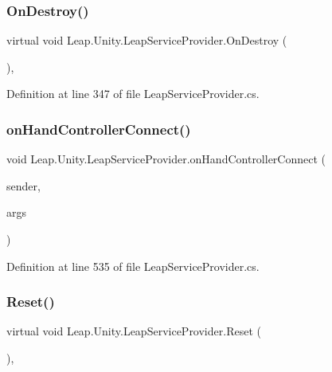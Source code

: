 \subsubsection{\texorpdfstring{OnDestroy()}{OnDestroy()}}
{\footnotesize\ttfamily virtual void Leap.\+Unity.\+Leap\+Service\+Provider.\+On\+Destroy (\begin{DoxyParamCaption}{ }\end{DoxyParamCaption})\hspace{0.3cm}{\ttfamily [protected]}, {\ttfamily [virtual]}}



Definition at line 347 of file Leap\+Service\+Provider.\+cs.

\mbox{\label{class_leap_1_1_unity_1_1_leap_service_provider_aa5658f3913410c8e03b5cc954f8754e6}} 
\subsubsection{\texorpdfstring{onHandControllerConnect()}{onHandControllerConnect()}}
{\footnotesize\ttfamily void Leap.\+Unity.\+Leap\+Service\+Provider.\+on\+Hand\+Controller\+Connect (\begin{DoxyParamCaption}\item[{object}]{sender,  }\item[{\mbox{\hyperlink{class_leap_1_1_leap_event_args}{Leap\+Event\+Args}}}]{args }\end{DoxyParamCaption})\hspace{0.3cm}{\ttfamily [protected]}}



Definition at line 535 of file Leap\+Service\+Provider.\+cs.

\mbox{\label{class_leap_1_1_unity_1_1_leap_service_provider_af249b412176e1018f24d4628cb476316}} 
\subsubsection{\texorpdfstring{Reset()}{Reset()}}
{\footnotesize\ttfamily virtual void Leap.\+Unity.\+Leap\+Service\+Provider.\+Reset (\begin{DoxyParamCaption}{ }\end{DoxyParamCaption})\hspace{0.3cm}{\ttfamily [protected]}, {\ttfamily [virtual]}}



